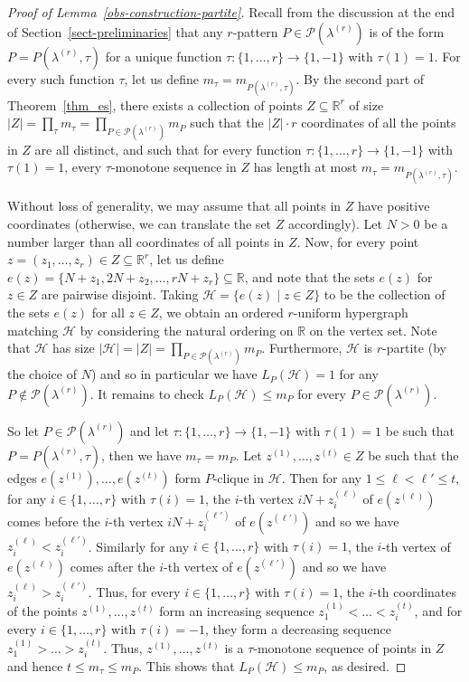 \documentclass[11pt]{article}
\theoremstyle{definition}
\numberwithin{equation}{section}
\numberwithin{figure}{section}
\newcommand{\su}{\subseteq}
\newcommand{\HH}{\mathcal{H}}
\newcommand{\PP}{\mathcal{P}}
\begin{document}
\begin{proof}[Proof of Lemma~\ref{obs-construction-partite}]
    Recall from the discussion at the end of Section~\ref{sect-preliminaries} that any $r$-pattern $P\in \PP(\lambda^{(r)})$ is of the form $P=P(\lambda^{(r)},\tau)$ for a unique function $\tau:\{1,\dots,r\}\to \{1,-1\}$ with $\tau(1)=1$. For every such function $\tau$, let us define $m_\tau=m_{P(\lambda^{(r)},\tau)}$. By the second part of Theorem~\ref{thm_es}, there exists a collection of points $Z\su \mathbb{R}^r$ of size $|Z|=\prod_{\tau} m_{\tau}=\prod_{P\in \PP(\lambda^{(r)})} m_{P}$ such that the $|Z|\cdot r$ coordinates of all the points in $Z$ are all distinct, and such that for every function $\tau:\{1,\dots,r\}\to \{1,-1\}$ with $\tau(1)=1$, every $\tau$-monotone sequence in $Z$ has length at most $m_\tau=m_{P(\lambda^{(r)},\tau)}$.
    
    Without loss of generality, we may assume that all points in $Z$ have positive coordinates (otherwise, we can translate the set $Z$ accordingly). Let $N>0$ be a number larger than all coordinates of all points in $Z$. Now, for every point $z=(z_1,\dots,z_r)\in Z\su \mathbb{R}^r$, let us define $e(z)=\{N+ z_1, 2N + z_2, \ldots, r N+z_r \}\su \mathbb{R}$, and note that the sets $e(z)$ for $z\in Z$ are pairwise disjoint. Taking $\HH=\{e(z)\mid z\in Z\}$ to be the collection of the sets $e(z)$ for all $z\in Z$, we obtain an ordered $r$-uniform hypergraph matching $\HH$ by considering the natural ordering on $\mathbb{R}$ on the vertex set. Note that $\HH$ has size $|\HH|=|Z|=\prod_{P\in \PP(\lambda^{(r)})} m_{P}$. Furthermore, $\HH$ is $r$-partite (by the choice of $N$) and so in particular we have $L_{P}(\HH)=1$ for any $P\not\in \PP(\lambda^{(r)})$. It remains to check $L_{P}(\HH)\le m_P$ for every $P\in \PP(\lambda^{(r)})$.

    So let $P\in \PP(\lambda^{(r)})$ and let $\tau:\{1,\dots,r\}\to \{1,-1\}$ with $\tau(1)=1$ be such that $P=P(\lambda^{(r)},\tau)$, then we have $m_\tau=m_P$. Let $z^{(1)},\dots,z^{(t)}\in Z$ be such that the edges $e(z^{(1)}),\dots,e(z^{(t)})$ form $P$-clique in $\HH$. Then for any $1\le \ell<\ell'\le t$, for any $i\in \{1,\dots,r\}$ with $\tau(i)=1$, the $i$-th vertex $iN+z^{(\ell)}_i$ of $e(z^{(\ell)})$ comes before the $i$-th vertex $iN+z^{(\ell')}_i$ of $e(z^{(\ell')})$ and so we have $z^{(\ell)}_i<z^{(\ell')}_i$. Similarly for any $i\in \{1,\dots,r\}$ with $\tau(i)=1$, the $i$-th vertex of $e(z^{(\ell)})$ comes after the $i$-th vertex of $e(z^{(\ell')})$ and so we have $z^{(\ell)}_i>z^{(\ell')}_i$. Thus, for every $i\in \{1,\dots,r\}$ with $\tau(i)=1$, the $i$-th coordinates of the points $z^{(1)},\dots,z^{(t)}$ form an increasing sequence 
    $z^{(1)}_1<\dots<z^{(t)}_i$, and for every $i\in \{1,\dots,r\}$ with $\tau(i)=-1$, they form a decreasing sequence $z^{(1)}_1>\dots>z^{(t)}_i$. Thus, $z^{(1)},\dots,z^{(t)}$ is a $\tau$-monotone sequence of points in $Z$ and hence $t\le m_\tau\le m_P$. This shows that $L_P(\HH)\le m_P$, as desired.
\end{proof}
\end{document}
